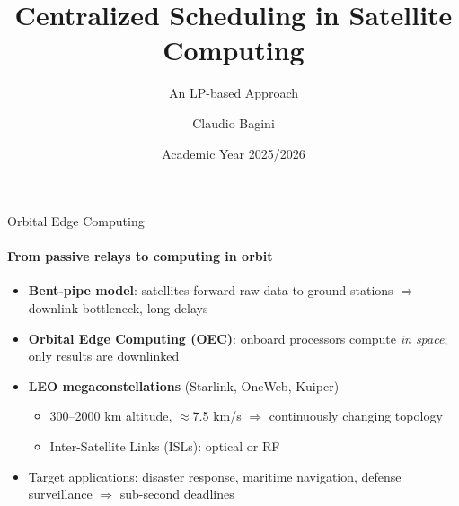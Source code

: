 \documentclass{beamer}
\title{Centralized Scheduling in Satellite Computing}
\subtitle{An LP-based Approach}
\author{Claudio Bagini}
\date{Academic Year 2025/2026}
\begin{document}
\maketitle

\begin{frame}{Orbital Edge Computing}
\framesubtitle{From passive relays to computing in orbit}
\begin{itemize}\setlength\itemsep{4pt}
  \item \textbf{Bent-pipe model}: satellites forward raw data to ground stations $\Rightarrow$ downlink bottleneck, long delays
  \item \textbf{Orbital Edge Computing (OEC)}: onboard processors compute \emph{in space}; only results are downlinked
  \item \textbf{LEO megaconstellations} (Starlink, OneWeb, Kuiper)
  \begin{itemize}
    \item 300--2000 km altitude, $\approx$7.5 km/s $\Rightarrow$ continuously changing topology
    \item Inter-Satellite Links (ISLs): optical or RF
  \end{itemize}
  \item Target applications: disaster response, maritime navigation, defense surveillance $\Rightarrow$ \alert{sub-second deadlines}
\end{itemize}
\end{frame}
\end{document}
